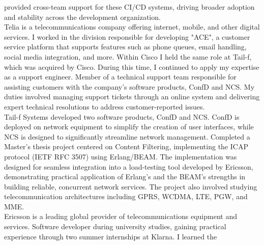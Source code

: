\documentclass[purpleprocv]{procv}
\begin{document}
\begin{procv-twocolumns}
{{          provided cross-team support for these CI/CD systems, driving 
          broader adoption and stability across the development organization.
          \\[3pt]
          Telia is a telecommunications company offering internet, mobile, and other digital services. I worked 
          in the division responsible for developing "ACE", a customer service platform that supports features 
          such as phone queues, email handling, social media integration, and more.}
          {Within Cisco I held the same role at Tail-f, which was acquired by Cisco. During this time, 
          I continued to apply my expertise as a support engineer.}
          {Member of a technical support team responsible for assisting customers with the company’s software 
          products, ConfD and NCS. My duties involved managing support tickets through an online system and delivering expert 
          technical resolutions to address customer-reported issues.
          \\[3pt]
          Tail-f Systems developed two software products, ConfD and NCS. ConfD is deployed on network equipment to simplify 
          the creation of user interfaces, while NCS is designed to significantly streamline network management.}
          {Completed a Master’s thesis project centered on Content Filtering, implementing the ICAP protocol (IETF RFC 3507) 
          using Erlang/BEAM. The implementation was designed for seamless integration into a load-testing tool developed by 
          Ericsson, demonstrating practical application of Erlang’s and the BEAM’s strengths in building reliable, concurrent 
          network services. The project also involved studying telecommunication architectures including GPRS, WCDMA, 
          LTE, PGW, and MME.
          \\[3pt]
          Ericsson is a leading global provider of telecommunications equipment and services.}
          {Software developer during university studies, gaining practical experience through two summer internships at Klarna. I learned the
}}
\end{procv-twocolumns}
\end{document}
